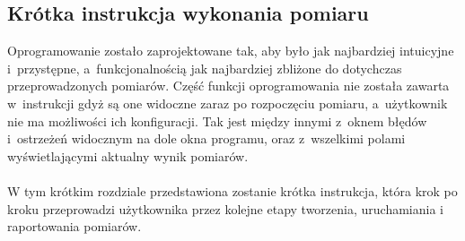 \newpage
\subsection{Krótka instrukcja wykonania pomiaru}

Oprogramowanie zostało zaprojektowane tak, aby było jak najbardziej intuicyjne i~przystępne, a~funkcjonalnością jak najbardziej zbliżone do dotychczas przeprowadzonych pomiarów. Część funkcji oprogramowania nie została zawarta w~instrukcji gdyż są one widoczne zaraz po rozpoczęciu pomiaru, a~użytkownik nie ma możliwości ich konfiguracji. Tak jest między innymi z~oknem błędów i~ostrzeżeń widocznym na dole okna programu, oraz z~wszelkimi polami wyświetlającymi aktualny wynik pomiarów. \\
\\
W tym krótkim rozdziale przedstawiona zostanie krótka instrukcja, która krok po kroku przeprowadzi użytkownika przez kolejne etapy tworzenia, uruchamiania i raportowania pomiarów. 
